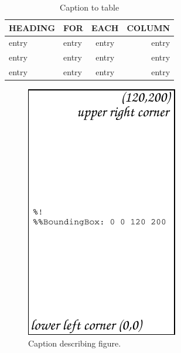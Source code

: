 \documentclass[preprint]{iucr}              %
\begin{document}
\begin{table}
\caption{Caption to table}
\begin{tabular}{llcr}      %
 HEADING    & FOR        & EACH       & COLUMN     \\
\hline
     entry      & entry      & entry      & entry      \\
 entry      & entry      & entry      & entry      \\
 entry      & entry      & entry      & entry      \\
\end{tabular}
\end{table}


\begin{figure}
\caption{Caption describing figure.}
\includegraphics{fig1}
\end{figure}
\end{document}
